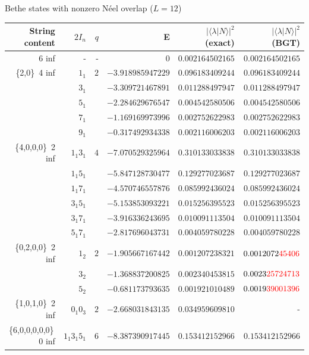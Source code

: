 \documentclass[11pt]{iopart}
\begin{document}
\begin{table}[ht]
\scriptsize
\centering
Bethe states with nonzero N\'eel overlap ($L=12$)\\[1ex]
\begin{tabular}{rrrrrr}
\toprule
String content & $2I_n$ & $q$ & E & $|\langle\lambda|N\rangle|^2$ (exact) & $|\langle
\lambda|N\rangle|^2$ (BGT) \\[0.3em]
\toprule
6 inf & - & - & $0$ & $0.002164502165$ & $0.002164502165$\\
\midrule
\{2,0\}\, 4 inf &$1_1$ & $2$ & $-3.918985947229$ & $0.096183409244$ & $0.096183409244$\\
 &$3_1 $ & & $-3.309721467891$ & $0.011288497947$ &             $0.011288497947$\\
 &$5_1 $ & & $-2.284629676547$ & $0.004542580506$ &             $0.004542580506$\\
 &$7_1 $ & & $-1.169169973996$ & $0.002752622983$ &             $0.002752622983$\\
 &$9_1 $ & & $-0.317492934338$ & $0.002116006203$ &             $0.002116006203$\\
\midrule
\{4,0,0,0\}\, 2 inf &$1_1 3_1 $ & $4$ & $-7.070529325964$ & $0.310133033838$ &$0.310133033838$\\
  &$1_1 5_1 $ & & $-5.847128730477$ & $0.129277023687$ &           $0.129277023687$\\
  &$ 1_1 7_1$ & & $-4.570746557876$ & $0.085992436024$ &           $0.085992436024$\\
  &$ 3_1 5_1$ & & $-5.153853093221$ & $0.015256395523$ &           $0.015256395523$\\
  &$3_1 7_1 $ & & $-3.916336243695$ & $0.010091113504$ &           $0.010091113504$\\
  &$5_1 7_1 $ & & $-2.817696043731$ & $0.004059780228$ &           $0.004059780228$\\
\midrule
\{0,2,0,0\}\, 2 inf &$1_2 $ & $2$ & $-1.905667167442$ & $0.001207238321$ & $0.0012072{\color{red}45406}$\\
  &$3_2 $ & & $-1.368837200825$ & $0.002340453815$ &            $0.0023{\color{red}25724713}$\\
  &$5_2 $ & & $-0.681173793635$ & $0.001921010489$ &            $0.0019{\color{red}39001396}$\\
\midrule
\{1,0,1,0\}\, 2 inf &$0_1 0_3$ & $2$ & $-2.668031843135$ & $0.034959609810$ & -\\
\midrule
\{6,0,0,0,0,0\}\, 0 inf &$1_1 3_1 5_1$ & $6$ & $-8.387390917445$ & $0.153412152966$ & $0.153412152966$\\

\end{tabular}
\end{table}
\end{document}
